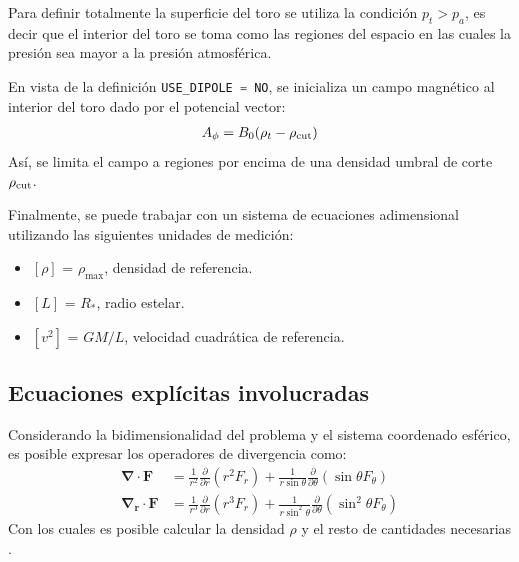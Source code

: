 \documentclass[11pt, letterpaper]{article}
\begin{document}
\medskip

Para definir totalmente la superficie del toro se utiliza la condición $p_t > p_a$, es decir que el interior del toro se toma como las regiones del espacio en las cuales la presión sea mayor a la presión atmosférica.

\medskip

En vista de la definición \lstinline[language=C]{USE_DIPOLE = NO}, se inicializa un campo magnético al interior del toro dado por el potencial vector:
\begin{align}\label{eq:magfield_vectorpot}
    A_\phi = B_0 (\rho_t - \rho_{\rm{cut}})
\end{align}
Así, se limita el campo a regiones por encima de una densidad umbral de corte $\rho_{\rm{cut}}$.

\medskip

Finalmente, se puede trabajar con un sistema de ecuaciones adimensional utilizando las siguientes unidades de medición:
\begin{itemize}
    \item $[\rho]$ = $\rho_{\max}$, densidad de referencia.
    \item $[L]$ = $R_*$, radio estelar.
    \item $[v^2]$ = $GM/L$, velocidad cuadrática de referencia.
\end{itemize}

\subsection{Ecuaciones explícitas involucradas}
Considerando la bidimensionalidad del problema y el sistema coordenado esférico, es posible expresar los operadores de divergencia como:
\begin{align*}
    \mathbf{\nabla \cdot F} &= \frac{1}{r^2} \frac{\partial}{\partial r} (r^2 F_r) + \frac{1}{r \sin \theta} \frac{\partial}{\partial \theta} (\sin \theta F_\theta) \\[5pt]
    \mathbf{\nabla_r \cdot F} &= \frac{1}{r^3} \frac{\partial}{\partial r} (r^3 F_r) + \frac{1}{r \sin^2 \theta} \frac{\partial}{\partial \theta} (\sin^2 \theta F_\theta)
\end{align*}
Con los cuales es posible calcular la densidad $\rho$ y el resto de cantidades necesarias .

\medskip
\end{document}
